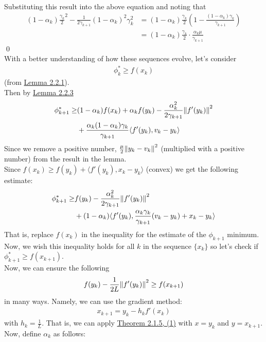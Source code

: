 \documentclass[12pt,a4paper]{article}
\begin{document}
 	Substituting this result into the above equation and noting that 
 	\begin{align*}
 		(1 - \alpha_k)\frac{\gamma_k}{2}^2 - \frac{1}{2\gamma_{k+1}}(1 - \alpha_k)^2\gamma_k^2 &= (1 - \alpha_k)\frac{\gamma_k}{2}(1 - \frac{(1 - \alpha_k)\gamma_k}{\gamma_{k+1}})\\
 		&= (1 - \alpha_k)\frac{\gamma_k}{2}\cdot \frac{\alpha_k\mu}{\gamma_{k+1}}
 	\end{align*}
	 \qed \\
	 With a better understanding of how these sequences evolve, let's consider 
	 \begin{align*}
	 	\phi_k^* \geq f(x_k)
	 \end{align*}
	 (from \hyperref[lem221]{Lemma 2.2.1}). \\
	 Then by \hyperref[lem223]{Lemma 2.2.3}
	 \begin{align*}
	 	\phi_{k+1}^* \geq &(1 - \alpha_k)f(x_k) + \alpha_kf(y_k) - \frac{\alpha_k^2}{2\gamma_{k+1}}\norm{f'(y_k)}^2 \\
	 	&+ \frac{\alpha_k(1 - \alpha_k)\gamma_k}{\gamma_{k+1}}\langle f'(y_k), v_k - y_k \rangle 
	 \end{align*}
	 Since we remove a positive number, $\frac{\mu}{2}\norm{y_k - v_k}^2$ (multiplied with a positive number)  from the result in the lemma. \\
	 Since $f(x_k) \geq f(y_k) + \langle f'(y_k), x_k - y_k \rangle$ (convex) we get the following estimate:
	 \begin{align*}
	 	\phi_{k+1}^* \geq &f(y_k) - \frac{\alpha_k^2}{2 \gamma_{k+1}}\norm{f'(y_k)}^2 \\
	 	&+ (1 - \alpha_k)\langle f'(y_k), \frac{\alpha_k\gamma_k}{\gamma_{k+1}}(v_k - y_k) + x_k - y_k \rangle 
	 \end{align*}
	 That is, replace $f(x_k)$ in the inequality for the estimate of the $\phi_{k+1}$ minimum. \\
	 Now, we wish this inequality holds for all $k$ in the sequence $\{x_k\}$ so let's check if $\phi_{k+1}^* \geq f(x_{k+1})$. \\
	 Now, we can ensure the following
	 \begin{align*}
	 	f(y_k) - \frac{1}{2L} \norm{f'(y_k)}^2 \geq f(x_{k+1})
	 \end{align*}
	 in many ways. Namely, we can use the gradient method:
	 \begin{align*}
	 	x_{k+1} = y_k - h_kf'(x_k)
	 \end{align*}
	 with $h_k = \frac{1}{L}$. That is, we can apply \hyperref[thm215]{Theorem 2.1.5, (1)} with $x = y_k$ and $y = x_{k+1}$. Now, define $\alpha_k$ as follows:
\end{document}
